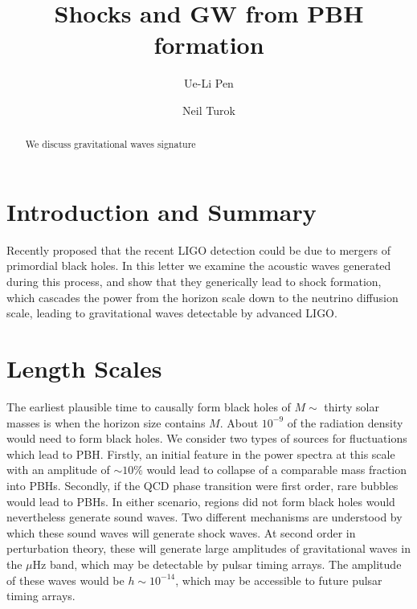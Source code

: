 \documentclass[aps,showpacs,twocolumn,floats,prd,superscriptaddress,nofootinbib]{revtex4}
\begin{document}
\title{Shocks and GW from PBH formation}


\author{Ue-Li Pen}

\author{Neil Turok}

\begin{abstract}
We discuss gravitational waves signature
\end{abstract}

\maketitle

\section{Introduction and Summary}

Recently \citet{2016arXiv160300464B} proposed that the recent LIGO
detection\cite{2016PhRvL.116f1102A} could be due to mergers of
primordial black holes.  In this letter we examine the acoustic waves
generated during this process, and show that they generically lead to
shock formation, which cascades the power from the horizon scale down
to the neutrino diffusion scale, leading to gravitational waves
detectable by advanced LIGO.

\section{Length Scales}

The earliest plausible time to causally form black holes of $M\sim$
thirty solar masses is when the horizon size contains $M$.  About
$10^{-9}$ of the radiation density would need to form black holes.  We
consider two types of sources for fluctuations which lead to PBH.
Firstly, an initial feature in the power spectra at this scale with an
amplitude of $\sim 10\%$ would lead to collapse of a comparable mass
fraction into PBHs\cite{Kühnel2016}.  Secondly, if the QCD phase transition were first
order, rare bubbles would lead to PBHs.  In either scenario, regions
did not form black holes would nevertheless generate sound waves.  Two
different mechanisms are understood by which these sound waves will
generate shock waves.  At second order in perturbation theory, these
will generate large amplitudes of gravitational waves in the $\mu$Hz
band\cite{2007PhRvD..76h4019B}, which may be detectable by pulsar
timing arrays.  The amplitude of these waves would be
$h \sim 10^{-14}$, which may be accessible to future pulsar timing
arrays\cite{kramer04}.
\end{document}
